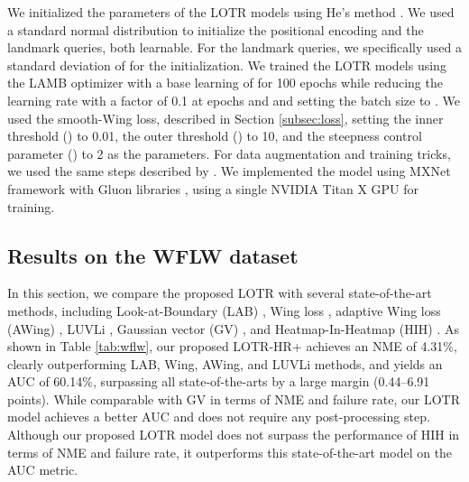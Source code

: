 \documentclass[journal]{IEEEtran}
\begin{document}
We initialized the parameters of the LOTR models using He's method \cite{he2015}. 
We used a standard normal distribution to initialize the positional encoding and the landmark queries, both learnable.
For the landmark queries, we specifically used a standard deviation of  for the initialization.
We trained the LOTR models using the LAMB optimizer \cite{You2019a} with a base learning of  for 100 epochs while reducing the learning rate with a factor of 0.1 at epochs  and  and setting the batch size to .
We used the smooth-Wing loss, described in Section \ref{subsec:loss}, setting the inner threshold () to 0.01, the outer threshold () to 10, and the steepness control parameter () to 2
as the parameters.
For data augmentation and training tricks, we used the same steps described by \cite{earp2021sub}.
We implemented the model using MXNet framework \cite{chen2015} with Gluon libraries \cite{guo2020}, using a single NVIDIA Titan X GPU for training.

\subsection{Results on the WFLW dataset}\label{subsubsec:wflw}

In this section, we compare the proposed LOTR with several state-of-the-art methods, including Look-at-Boundary (LAB) \cite{Wu2018}, Wing loss \cite{Feng2017}, adaptive Wing loss (AWing) \cite{Wang2019c}, LUVLi \cite{Kumar2020}, Gaussian vector (GV) \cite{xiong2020}, and Heatmap-In-Heatmap (HIH) \cite{lan2021hih}. As shown in Table \ref{tab:wflw}, our proposed LOTR-HR+ achieves an NME of 4.31\%, clearly outperforming LAB, Wing, AWing, and LUVLi methods, and yields an AUC of 60.14\%, surpassing all state-of-the-arts by a large margin (0.44--6.91 points).
While comparable with GV in terms of NME and failure rate, our LOTR model achieves a better AUC and does not require any post-processing step.
Although our proposed LOTR model does not surpass the performance of HIH in terms of NME and failure rate, it outperforms this state-of-the-art model on the AUC metric.
\end{document}
